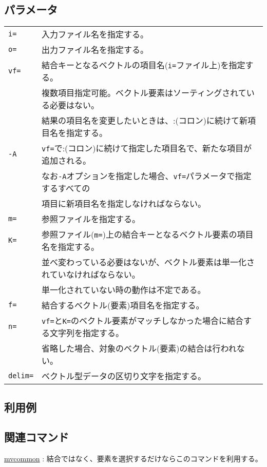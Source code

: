 \subsection*{パラメータ}
\begin{table}[htbp]
{\small
\begin{tabular}{ll}
\verb|i=|    & 入力ファイル名を指定する。\\
\verb|o=|    & 出力ファイル名を指定する。\\
\verb|vf=| & 結合キーとなるベクトルの項目名(\verb|i=|ファイル上)を指定する。\\
           & 複数項目指定可能。ベクトル要素はソーティングされている必要はない。 \\
		   & 結果の項目名を変更したいときは、:(コロン)に続けて新項目名を指定する。\\
\verb|-A|  & \verb|vf=|で:(コロン)に続けて指定した項目名で、新たな項目が追加される。\\
           & なお\verb|-A|オプションを指定した場合、\verb|vf=|パラメータで指定するすべての\\
           & 項目に新項目名を指定しなければならない。\\
\verb|m=|  & 参照ファイルを指定する。\\
\verb|K=|  & 参照ファイル(\verb|m=|)上の結合キーとなるベクトル要素の項目名を指定する。\\
           & 並べ変わっている必要はないが、ベクトル要素は単一化されていなければならない。\\
           & 単一化されていない時の動作は不定である。\\
\verb|f=|  & 結合するベクトル(要素)項目名を指定する。 \\
\verb|n=|  & \verb|vf=|と\verb|K=|のベクトル要素がマッチしなかった場合に結合する文字列を指定する。 \\
           & 省略した場合、対象のベクトル(要素)の結合は行われない。 \\
\verb|delim=| & ベクトル型データの区切り文字を指定する。\\
\end{tabular}
}
\end{table} 

\subsection*{利用例}

\subsection*{関連コマンド}
\hyperref[sect:mvcommon]{mvcommon} : 結合ではなく、要素を選択するだけならこのコマンドを利用する。

%
